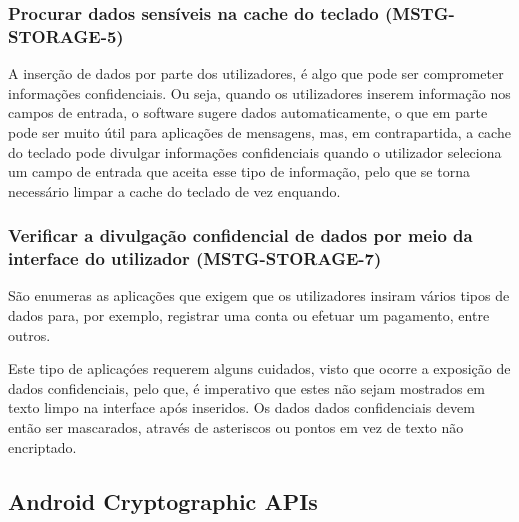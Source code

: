 \subsubsection{Procurar dados sensíveis na cache do teclado (MSTG-STORAGE-5)}\par
\hfill\par
\hfill\par
\par A inserção de dados por parte dos utilizadores, é algo que pode ser comprometer informações confidenciais. Ou seja, quando os utilizadores inserem informação nos campos de entrada, o software sugere dados automaticamente, o que em parte pode ser muito útil para aplicações de mensagens, mas, em contrapartida, a cache do teclado pode divulgar informações confidenciais quando o utilizador seleciona um campo de entrada que aceita esse tipo de informação, pelo que se torna necessário limpar a cache do teclado de vez enquando.



\subsubsection{Verificar a divulgação confidencial de dados por meio da interface do utilizador (MSTG-STORAGE-7)}\par
\hfill\par
\hfill\par
\par São enumeras as aplicações que exigem que os utilizadores insiram vários tipos de dados para, por exemplo, registrar uma conta ou efetuar um pagamento, entre outros. 
\par Este tipo de aplicaçóes requerem alguns cuidados, visto que ocorre a exposição de dados confidenciais, pelo que, é imperativo que estes não sejam mostrados em texto limpo na interface após inseridos. Os dados dados confidenciais devem então ser mascarados, através de asteriscos ou pontos em vez de texto não encriptado.



\subsection{Android Cryptographic APIs}\par
\hfill\par
